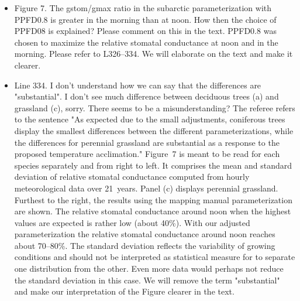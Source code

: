 \documentclass{scrartcl}
\begin{document}
\begin{itemize}
\item {\color{blue}Figure 7. The gstom/gmax ratio in the subarctic parameterization with PPFD0.8 is greater in the morning than at noon. How then the choice of PPFD08 is explained? Please comment on this in the text.}
PPFD0.8 was chosen to maximize the relative stomatal conductance at noon and in the morning. Please refer to L326--334. We will elaborate on the text and make it clearer. 

\item {\color{blue}Line 334. I don't understand how we can say that the differences are "substantial". I don't see much difference between deciduous trees (a) and grassland (c), sorry.}
There seems to be a misunderstanding? The referee refers to the sentence "As expected due to the small adjustments, coniferous trees display the smallest differences between the different parameterizations, while the differences for perennial grassland are substantial as a response to the proposed temperature acclimation." Figure~7 is meant to be read for each species separately and from right to left. It comprises the mean and standard deviation of relative stomatal conductance computed from hourly meteorological data over 21~years. Panel (c) displays perennial grassland. Furthest to the right, the results using the mapping manual parameterization are shown. The relative stomatal conductance around noon when the highest values are expected is rather low (about 40\%). With our adjusted parameterization the relative stomatal conductance around noon reaches about 70--80\%. The standard deviation reflects the variability of growing conditions and should not be interpreted as statistical measure for to separate one distribution from the other. Even more data would perhaps not reduce the standard deviation in this case.
We will remove the term "substantial" and make our interpretation of the Figure clearer in the text. 


\end{itemize}
\end{document}
